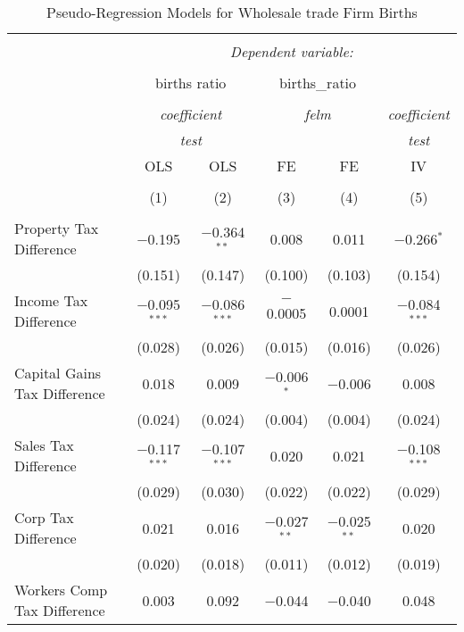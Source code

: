 
\begin{table}[!htbp] \centering 
  \caption{Pseudo-Regression Models for  Wholesale trade Firm Births} 
  \label{} 
\begin{tabular}{@{\extracolsep{5pt}}lccccc} 
\\[-1.8ex]\hline 
\hline \\[-1.8ex] 
 & \multicolumn{5}{c}{\textit{Dependent variable:}} \\ 
\cline{2-6} 
\\[-1.8ex] & \multicolumn{2}{c}{births ratio} & \multicolumn{2}{c}{births\_ratio} &   \\ 
\\[-1.8ex] & \multicolumn{2}{c}{\textit{coefficient}} & \multicolumn{2}{c}{\textit{felm}} & \textit{coefficient} \\ 
 & \multicolumn{2}{c}{\textit{test}} & \multicolumn{2}{c}{\textit{}} & \textit{test} \\ 
 & OLS & OLS & FE & FE & IV \\ 
\\[-1.8ex] & (1) & (2) & (3) & (4) & (5)\\ 
\hline \\[-1.8ex] 
 Property Tax Difference & $-$0.195 & $-$0.364$^{**}$ & 0.008 & 0.011 & $-$0.266$^{*}$ \\ 
  & (0.151) & (0.147) & (0.100) & (0.103) & (0.154) \\ 
  Income Tax Difference & $-$0.095$^{***}$ & $-$0.086$^{***}$ & $-$0.0005 & 0.0001 & $-$0.084$^{***}$ \\ 
  & (0.028) & (0.026) & (0.015) & (0.016) & (0.026) \\ 
  Capital Gains Tax Difference & 0.018 & 0.009 & $-$0.006$^{*}$ & $-$0.006 & 0.008 \\ 
  & (0.024) & (0.024) & (0.004) & (0.004) & (0.024) \\ 
  Sales Tax Difference & $-$0.117$^{***}$ & $-$0.107$^{***}$ & 0.020 & 0.021 & $-$0.108$^{***}$ \\ 
  & (0.029) & (0.030) & (0.022) & (0.022) & (0.029) \\ 
  Corp Tax Difference & 0.021 & 0.016 & $-$0.027$^{**}$ & $-$0.025$^{**}$ & 0.020 \\ 
  & (0.020) & (0.018) & (0.011) & (0.012) & (0.019) \\ 
  Workers Comp Tax Difference & 0.003 & 0.092 & $-$0.044 & $-$0.040 & 0.048 \\ 

\end{tabular}
\end{table}
